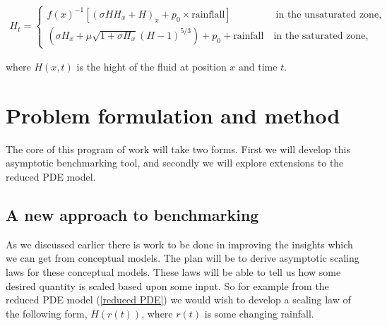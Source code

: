 \documentclass[11pt]{article}
\begin{document}
 \begin{align}
    H_t=\begin{cases}
        f(x)^{-1}[(\sigma HH_x+H)_x+p_0\times\text {rainflall}] \qquad \qquad  \ \; \text{in the unsaturated zone},\\
        (\sigma H_x+\mu\sqrt{1+\sigma H_x}(H-1)^{5/3})+p_0 +\text{rainfall} \quad \text{in the saturated zone}, \label{reduced PDE}
    \end{cases}
\end{align}

where $H(x,t)$ is the hight of the fluid at position $x$ and time $t$.


\section{Problem formulation and method}
The core of this program of work will take two forms. First we will develop this asymptotic benchmarking tool, and secondly we will explore extensions to the reduced PDE model. 
\subsection{A new approach to benchmarking}
As we discussed earlier there is work to be done in improving the insights which we can get from conceptual models. The plan will be to derive asymptotic scaling laws for these conceptual models. These laws will be able to tell us how some desired quantity is scaled based upon some input. So for example from the reduced PDE model (\ref{reduced PDE}) we would wish to develop a scaling law of the following form, $H(r(t))$, where $r(t)$ is some changing rainfall. 

\vspace{5pt}
\end{document}
